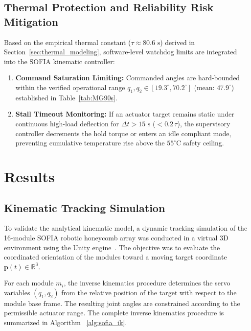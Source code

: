 \documentclass[lettersize,journal]{IEEEtran}
\begin{document}
\subsection{Thermal Protection and Reliability Risk Mitigation}
\label{sec:risk_mitigation}

Based on the empirical thermal constant ($\tau \approx 80.6\text{ s}$) derived in Section~\ref{sec:thermal_modeling}, software-level watchdog limits are integrated into the SOFIA kinematic controller:
\begin{enumerate}
\item \textbf{Command Saturation Limiting:} Commanded angles are hard-bounded within the verified operational range $q_1, q_2 \in [19.3^\circ, 70.2^\circ]$ (mean: $47.9^\circ$) established in Table~\ref{tab:MG90s}.
\item \textbf{Stall Timeout Monitoring:} If an actuator target remains static under continuous high-load deflection for $\Delta t > 15\text{ s}$ ($< 0.2\,\tau$), the supervisory controller decrements the hold torque or enters an idle compliant mode, preventing cumulative temperature rise above the $55^\circ\text{C}$ safety ceiling.
\end{enumerate}

\section{Results}
\label{sec:results}

\subsection{Kinematic Tracking Simulation}
\label{sec:results_simulation}

To validate the analytical kinematic model, a dynamic tracking
simulation of the 16-module SOFIA robotic honeycomb array was
conducted in a virtual 3D environment using the Unity engine~\cite{unity2023engine}. The objective was to evaluate
the coordinated orientation of the modules toward a moving target
coordinate $\mathbf{p}(t) \in \mathbb{R}^3$.

For each module $m_i$, the inverse kinematics procedure determines
the servo variables $(q_1,q_2)$ from the relative position of the
target with respect to the module base frame. The resulting joint
angles are constrained according to the permissible actuator range.
The complete inverse kinematics procedure is summarized in
Algorithm ~\ref{alg:sofia_ik}.
\end{document}
